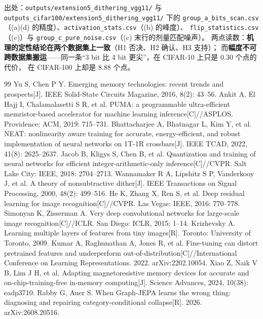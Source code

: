 \documentclass[11pt,a4paper]{ctexart}
\begin{document}
\noindent 出处：\texttt{outputs/\allowbreak extension5\_dithering\_vgg11/} 与
\texttt{outputs\_cifar100/\allowbreak extension5\_dithering\_vgg11/} 下的
\texttt{group\_a\_bits\_scan.csv}（(a)(d) 的精度）、\texttt{activation\_stats.csv}（(b) 的峰度）、
\texttt{flip\_statistics.csv}（(c)）与 \texttt{group\_c\_pure\_noise.csv}（(c) 末行的剂量匹配噪声）。
两点读数：\textbf{机理的定性结论在两个数据集上一致}（H1 否决、H2 确认、H3 支持）；
而\textbf{幅度不可跨数据集搬运}——同一条“3 bit 比 4 bit 更尖”，在 CIFAR-10 上只是 $0.30$ 个点的代价，
在 CIFAR-100 上却是 $8.88$ 个点。

\clearpage   %
\begin{thebibliography}{99}
 Yu S, Chen P Y. Emerging memory technologies: recent trends and prospects[J]. IEEE Solid-State Circuits Magazine, 2016, 8(2): 43--56.
 Ankit A, El Hajj I, Chalamalasetti S R, et al. PUMA: a programmable ultra-efficient memristor-based accelerator for machine learning inference[C]//ASPLOS. Providence: ACM, 2019: 715--731.
 Bhattacharjee A, Bhatnagar L, Kim Y, et al. NEAT: nonlinearity aware training for accurate, energy-efficient, and robust implementation of neural networks on 1T-1R crossbars[J]. IEEE TCAD, 2022, 41(8): 2625--2637.
 Jacob B, Kligys S, Chen B, et al. Quantization and training of neural networks for efficient integer-arithmetic-only inference[C]//CVPR. Salt Lake City: IEEE, 2018: 2704--2713.
 Wannamaker R A, Lipshitz S P, Vanderkooy J, et al. A theory of nonsubtractive dither[J]. IEEE Transactions on Signal Processing, 2000, 48(2): 499--516.
 He K, Zhang X, Ren S, et al. Deep residual learning for image recognition[C]//CVPR. Las Vegas: IEEE, 2016: 770--778.
 Simonyan K, Zisserman A. Very deep convolutional networks for large-scale image recognition[C]//ICLR. San Diego: ICLR, 2015: 1--14.
 Krizhevsky A. Learning multiple layers of features from tiny images[R]. Toronto: University of Toronto, 2009.
 Kumar A, Raghunathan A, Jones R, et al. Fine-tuning can distort pretrained features and underperform out-of-distribution[C]//International Conference on Learning Representations. 2022. arXiv:2202.10054.
 Xiao Z, Naik V B, Lim J H, et al. Adapting magnetoresistive memory devices for accurate and on-chip-training-free in-memory computing[J]. Science Advances, 2024, 10(38): eadp3710.
 Rabby G, Auer S. When Graph-JEPA learns the wrong thing: diagnosing and repairing category-conditional collapse[R]. 2026. arXiv:2608.20516.

\end{thebibliography}
\end{document}
